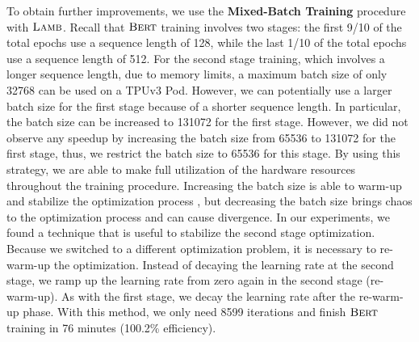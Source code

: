 To obtain further improvements, we use the {\bf Mixed-Batch Training} procedure with $\textsc{Lamb}$. 
Recall that $\textsc{Bert}$ training involves two stages: the first 9/10 of the total epochs use a sequence length of 128, while the last 1/10 of the total epochs use a sequence length of 512. 
For the second stage training, which involves a longer sequence length, due to memory limits, a maximum batch size of only 32768 can be used on a TPUv3 Pod. However, we can potentially use a larger batch size for the first stage because of a shorter sequence length. 
In particular, the batch size can be increased to 131072 for the first stage. 
However, we did not observe any speedup by increasing the batch size from 65536 to 131072 for the first stage, thus, we restrict the batch size to 65536 for this stage. 
By using this strategy, we are able to make full utilization of the hardware resources throughout the training procedure. 
Increasing the batch size is able to warm-up and stabilize the optimization process \citep{smith2017don}, but decreasing the batch size brings chaos to the optimization process and can cause divergence.
In our experiments, we found a technique that is useful to stabilize the second stage optimization.
Because we switched to a different optimization problem, it is necessary to re-warm-up the optimization.
Instead of decaying the learning rate at the second stage, we ramp up the learning rate from zero again in the second stage (re-warm-up).
As with the first stage, we decay the learning rate after the re-warm-up phase.
With this method, we only need 8599 iterations and finish $\textsc{Bert}$ training in 76 minutes (100.2\% efficiency).



